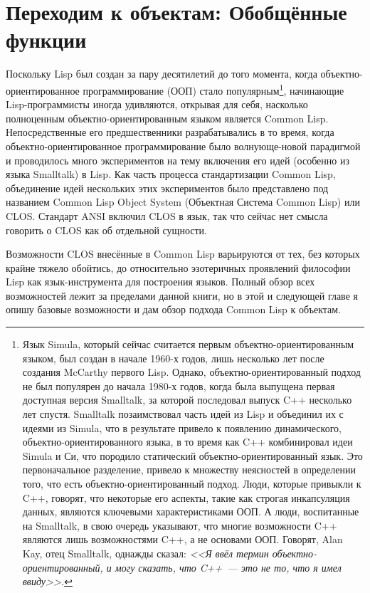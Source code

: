 \chapter{Переходим к объектам: Обобщённые функции}
\label{ch:16}

Поскольку Lisp был создан за пару десятилетий до того момента, когда
объектно-ориентированное программирование (ООП) стало популярным\footnote{Язык Simula,
  который сейчас считается первым объектно-ориентированным языком, был создан в начале
  1960-х годов, лишь несколько лет после создания McCarthy первого Lisp.  Однако,
  объектно-ориентированный подход не был популярен до начала 1980-х годов, когда была
  выпущена первая доступная версия Smalltalk, за которой последовал выпуск C++ несколько
  лет спустя.  Smalltalk позаимствовал часть идей из Lisp и объединил их с идеями из
  Simula, что в результате привело к появлению динамического, объектно-ориентированного
  языка, в то время как C++ комбинировал идеи Simula и Си, что породило статический
  объектно-ориентированный язык. Это первоначальное разделение, привело к множеству
  неясностей в определении того, что есть объектно-ориентированный подход.  Люди, которые
  привыкли к C++, говорят, что некоторые его аспекты, такие как строгая инкапсуляция
  данных, являются ключевыми характеристиками ООП. А люди, воспитанные на Smalltalk, в
  свою очередь указывают, что многие возможности C++ являются лишь возможностями C++, а не
  основами ООП.  Говорят, Alan Kay, отец Smalltalk, однажды сказал: \textit{<<Я ввёл термин
    объектно-ориентированный, и могу сказать, что C++~--- это не то, что я имел ввиду>>.}},
начинающие Lisp-программисты иногда удивляются, открывая для себя, насколько полноценным
объектно-ориентированным языком является Common Lisp.  Непосредственные его
предшественники разрабатывались в то время, когда объектно-ориентированное
программирование было волнующе-новой парадигмой и проводилось много экспериментов на тему
включения его идей (особенно из языка Smalltalk) в Lisp.  Как часть процесса
стандартизации Common Lisp, объединение идей нескольких этих экспериментов было
представлено под названием Common Lisp Object System (Объектная Система Common Lisp) или
CLOS. Стандарт ANSI
включил CLOS в язык, так что сейчас нет смысла говорить о CLOS как об отдельной сущности.

Возможности CLOS внесённые в Common Lisp варьируются от тех, без которых крайне тяжело
обойтись, до относительно эзотеричных проявлений философии Lisp как язык-инструмента для
построения языков.  Полный обзор всех возможностей лежит за пределами данной книги, но в
этой и следующей главе я опишу базовые возможности и дам обзор подхода Common Lisp к
объектам.

